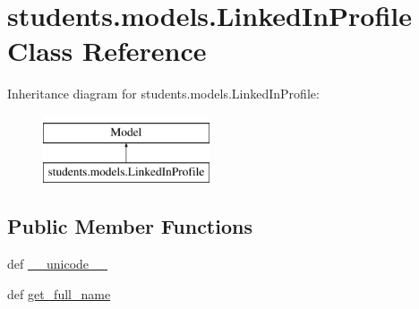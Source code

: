 \hypertarget{classstudents_1_1models_1_1_linked_in_profile}{\section{students.\-models.\-Linked\-In\-Profile Class Reference}
\label{classstudents_1_1models_1_1_linked_in_profile}
}
Inheritance diagram for students.\-models.\-Linked\-In\-Profile\-:\begin{figure}[H]
\begin{center}
\leavevmode
\includegraphics[height=2.000000cm]{classstudents_1_1models_1_1_linked_in_profile}
\end{center}
\end{figure}
\subsection*{Public Member Functions}
\begin{DoxyCompactItemize}
\item 
def \hyperlink{classstudents_1_1models_1_1_linked_in_profile_a625f309407380b0239ed0ba4a8fcd8f8}{\-\_\-\-\_\-unicode\-\_\-\-\_\-}
\item 
def \hyperlink{classstudents_1_1models_1_1_linked_in_profile_af7294caa5c9dd7dc43bed9b4ff962e20}{get\-\_\-full\-\_\-name}
\end{DoxyCompactItemize}

